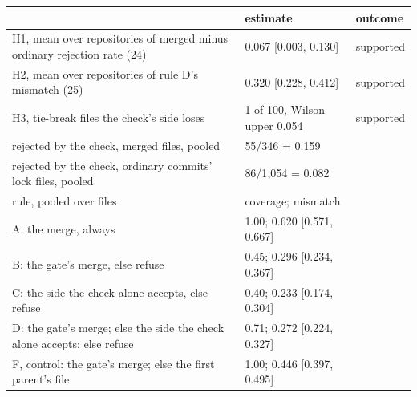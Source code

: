 \begin{tabular}{lll}
\toprule
& estimate & outcome \\
\midrule
H1, mean over repositories of merged minus ordinary rejection rate (24) & 0.067 [0.003, 0.130] & supported \\
H2, mean over repositories of rule D's mismatch (25) & 0.320 [0.228, 0.412] & supported \\
H3, tie-break files the check's side loses & 1 of 100, Wilson upper 0.054 & supported \\
\midrule
rejected by the check, merged files, pooled & 55/346 = 0.159 & \\
rejected by the check, ordinary commits' lock files, pooled & 86/1{,}054 = 0.082 & \\
\midrule
rule, pooled over files & coverage; mismatch & \\
\quad A: the merge, always & 1.00; 0.620 [0.571, 0.667] & \\
\quad B: the gate's merge, else refuse & 0.45; 0.296 [0.234, 0.367] & \\
\quad C: the side the check alone accepts, else refuse & 0.40; 0.233 [0.174, 0.304] & \\
\quad D: the gate's merge; else the side the check alone accepts; else refuse & 0.71; 0.272 [0.224, 0.327] & \\
\quad F, control: the gate's merge; else the first parent's file & 1.00; 0.446 [0.397, 0.495] & \\
\bottomrule
\end{tabular}
